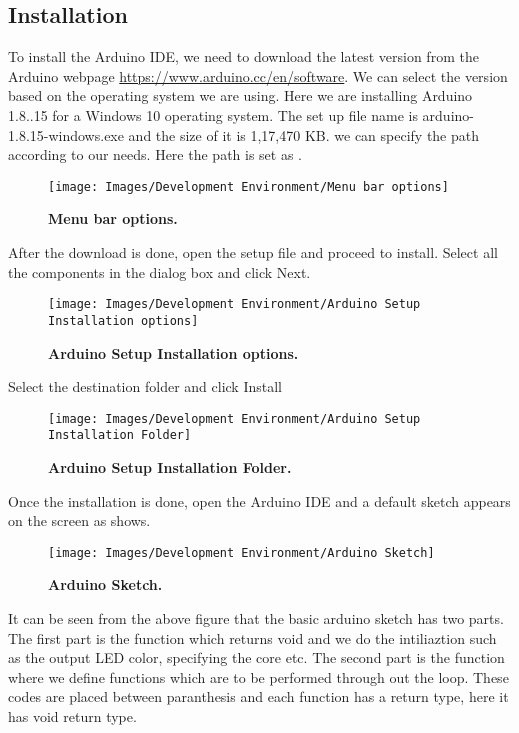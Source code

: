 \subsection{Installation}
\label{Arduinoide}
To install the Arduino IDE, we need to download the latest version from the Arduino webpage \url{https://www.arduino.cc/en/software}. We can select the version based on the operating system we are using. Here we are installing Arduino 1.8..15 for a Windows 10 operating system. 
The set up file name is arduino-1.8.15-windows.exe and the size of it is 1,17,470 KB. we can specify the path according to our needs. Here the path is set as  .
\begin{figure}[H]\centering
	\texttt{[image: Images/Development Environment/Menu bar options]}
	\caption{\textbf{Menu bar options.}}
	\label{fig::Menu bar options}		
\end{figure}
After the download is done, open the setup file and proceed to install.
Select all the components in the dialog box and click Next.\\

\begin{figure}[H]\centering
	\texttt{[image: Images/Development Environment/Arduino Setup Installation options]}
	\caption{\textbf{Arduino Setup Installation options.}}
	\label{fig:Arduino Setup Installation options}		
\end{figure}

Select the destination folder and click Install

\begin{figure}[H]\centering
	\texttt{[image: Images/Development Environment/Arduino Setup Installation Folder]}
	\caption{\textbf{Arduino Setup Installation Folder.}}
	\label{fig:Arduino Setup Installation Folder}		
\end{figure}

Once the installation is done, open the Arduino IDE and a default sketch appears on the screen as shows.

\begin{figure}[H]\centering
	\texttt{[image: Images/Development Environment/Arduino Sketch]}
	\caption{\textbf{Arduino Sketch.}}
	\label{fig:Arduino Sketch}		
\end{figure}


It can be seen from the above figure that the basic arduino sketch has two parts. The first part is the function  which returns void and we do the intiliaztion such as the output LED color, specifying the core etc. The second part is the function  where we define functions which are to be performed through out the loop. These codes are placed between paranthesis \PYTHON{$\{ \}$} and each function has a return type, here it has void return type.



